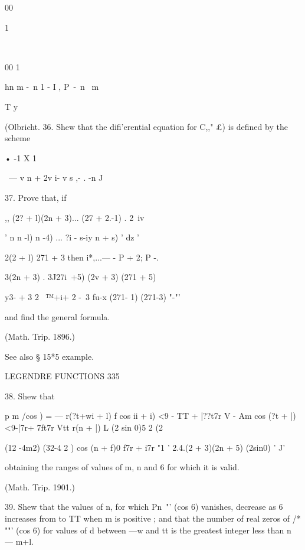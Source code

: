 {{{{00



1



\



00 1



hn m -\ n 1 - I , P\ -\ n \ m ~



T y



(Olbricht. 36. Shew that the difi'erential equation for C,," £) is
defined by the scheme



• -1 X 1 \

\ — v n + 2v i- v s ,- . -n J



37. Prove that, if



,, (2? + l)(2n + 3)... (27 + 2.-1) . 2\ iv

 ' n n -l) n -4) ... ?i - s-iy n + s) ' dz '

2(2 + l) 271 + 3 then i*,...— - P + 2; P -.

3(2n + 3) . 3J27i\ +5) (2v + 3) (271 + 5)

y3- + 3 2 \ ™+i+ 2 -\ 3 fu-x (271- 1) (271-3) "-"'



and find the general formula.



(Math. Trip. 1896.)



See also § 15*5 example.



LEGENDRE FUNCTIONS 335



38. Shew that



p m /cos ) = — r(?t+wi + l) f cos ii + i) <9 - TT + |??t7r V - Am cos
(?t + |)<9-|7r+ 7ft7r Vtt r(n + |) L (2 sin 0)5 2 (2%

(12 -4m2) (32-4 2 ) cos (n + f)0 f7r + i7r "1 ' 2.4.(2 + 3)(2n + 5)
(2sin0) ' J'

obtaining the ranges of values of m, n and 6 for which it is valid.

(Math. Trip. 1901.)

39. Shew that the values of n, for which Pn~"' (cos 6) vanishes,
decrease as 6 increases from to TT when m is positive ; and that the
number of real zeros of /* ""' (cos 6) for values of d between —w and
tt is the greatest integer less than n — m+l.

}}}}
